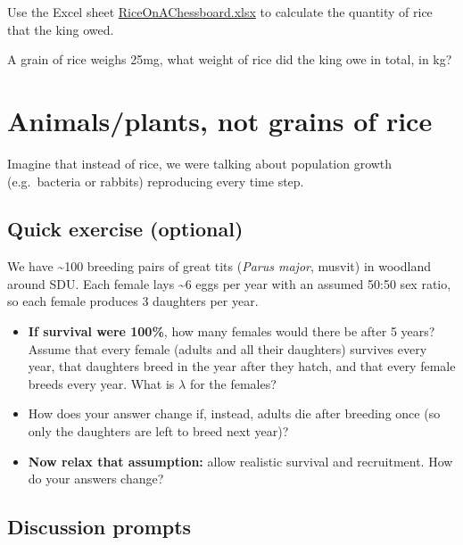 \documentclass[
  a4paper]{book}
\providecommand{\tightlist}{%
  \setlength{\itemsep}{0pt}\setlength{\parskip}{0pt}}
\begin{document}
Use the Excel sheet \href{https://www.dropbox.com/s/nf81t0hzz34vyzk/RiceOnAChessboard.xlsx?dl=1}{RiceOnAChessboard.xlsx} to calculate the quantity of rice that the king owed.

A grain of rice weighs 25mg, what weight of rice did the king owe in total, in kg?

\section{Animals/plants, not grains of rice}\label{animalsplants-not-grains-of-rice}

Imagine that instead of rice, we were talking about population growth (e.g.~bacteria or rabbits) reproducing every time step.

\subsection{Quick exercise (optional)}\label{quick-exercise-optional}

We have \textasciitilde100 breeding pairs of great tits (\emph{Parus major}, musvit) in woodland around SDU. Each female lays \textasciitilde6 eggs per year with an assumed 50:50 sex ratio, so each female produces 3 daughters per year.

\begin{itemize}
\tightlist
\item
  \textbf{If survival were 100\%}, how many females would there be after 5 years? Assume that every female (adults and all their daughters) survives every year, that daughters breed in the year after they hatch, and that every female breeds every year. What is \(\lambda\) for the females?
\item
  How does your answer change if, instead, adults die after breeding once (so only the daughters are left to breed next year)?
\item
  \textbf{Now relax that assumption:} allow realistic survival and recruitment. How do your answers change?
\end{itemize}

\subsection{Discussion prompts}\label{discussion-prompts}
\end{document}
